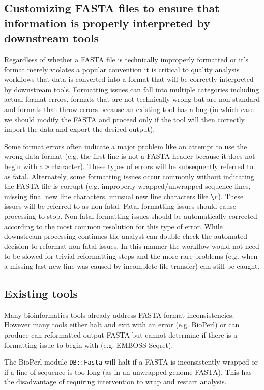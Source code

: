 \subsection{Customizing FASTA files to ensure that information is properly interpreted by downstream tools}

Regardless of whether a FASTA file is technically improperly formatted or it's format merely violates a popular convention it is critical to quality analysis workflows that data is converted into a format that will be correctly interpreted by downstream tools. Formatting issues can fall into multiple categories including actual format errors, formats that are not technically wrong but are non-standard and formats that throw errors because an existing tool has a bug (in which case we should modify the FASTA and proceed only if the tool will then correctly import the data and export the desired output). 

Some format errors often indicate a major problem like an attempt to use the wrong data format (e.g. the first line is not a FASTA header because it does not begin with a \verb|>| character). These types of errors will be subsequently referred to as fatal. Alternately, some formatting issues occur commonly without indicating the FASTA file is corrupt (e.g. improperly wrapped/unwrapped sequence lines, missing final new line characters, unusual new line characters like \verb|\r|). These issues will be referred to as non-fatal. Fatal formatting issues should cause processing to stop. Non-fatal formatting issues should be automatically corrected according to the most common resolution for this type of error. While downstream processing continues the analyst can double check the automated decision to reformat non-fatal issues. In this manner the workflow would not need to be slowed for trivial reformatting steps and the more rare problems (e.g. when a missing last new line was caused by incomplete file transfer) can still be caught.
  
\subsection{Existing tools}

Many bioinformatics tools already address FASTA format inconsistencies. However many tools either halt and exit with an error (e.g. BioPerl) or can produce can reformatted output FASTA but cannot determine if there is a formatting issue to begin with (e.g. EMBOSS Seqret). 

The BioPerl module \verb|DB::Fasta| will halt if a FASTA is inconsistently wrapped or if a line of sequence is too long (as in an unwrapped genome FASTA). This has the disadvantage of requiring intervention to wrap and restart analysis.

